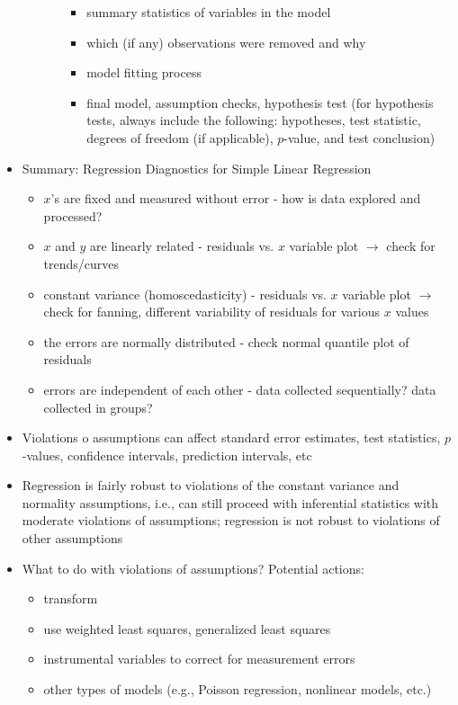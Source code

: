 \documentclass[12pt]{article}
\begin{document}
\begin{itemize}
\begin{itemize}
\begin{itemize}
\begin{itemize}
\item summary statistics of variables in the model 
\item which (if any) observations were removed and why 
\item model fitting process 
\item final model, assumption checks, hypothesis test (for hypothesis tests, always include the following: hypotheses, test statistic, degrees of freedom (if applicable), $p$-value, and test conclusion)
\end{itemize} \end{itemize} \end{itemize}
\item Summary: Regression Diagnostics for Simple Linear Regression \begin{itemize} 
\item $x$'s are fixed and measured without error - how is data explored and processed? 
\item $x$ and $y$ are linearly related - residuals vs. $x$ variable plot $\to$ check for trends/curves 
\item constant variance (homoscedasticity) - residuals vs. $x$ variable plot $\to$ check for fanning, different variability of residuals for various $x$ values 
\item the errors are normally distributed - check normal quantile plot of residuals 
\item errors are independent of each other - data collected sequentially? data collected in groups? \end{itemize} 
\item Violations o assumptions can affect standard error estimates, test statistics, $p$-values, confidence intervals, prediction intervals, etc 
\item Regression is fairly robust to violations of the constant variance and normality assumptions, i.e., can still proceed with inferential statistics with moderate violations of assumptions; regression is not robust to violations of other assumptions 
\item What to do with violations of assumptions? Potential actions: \begin{itemize} 
\item transform
\item use weighted least squares, generalized least squares 
\item instrumental variables to correct for measurement errors 
\item other types of models (e.g., Poisson regression, nonlinear models, etc.) \end{itemize} 
\end{itemize}
\end{document}
